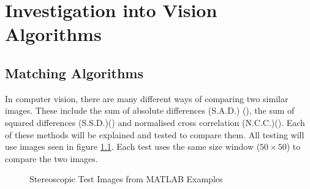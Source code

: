 \chapter{Investigation into Vision Algorithms} \label{Chapter:InvestigationVision}

\section{Matching Algorithms}\label{Section:Comparison}
In computer vision, there are many different ways of comparing two similar images. These include the sum of absolute differences (S.A.D.) (\cite{Hamzah:DistanceDetection}), the sum of squared differences (S.S.D.)(\cite{Mrovlje:Distance_Stereoscopic}) and  normalised cross correlation (N.C.C.)(\cite{zhao2006image}). Each of these methods will be explained and tested to compare them. All testing will use images seen in figure \ref{fig:StereoTest}. Each test uses the same size window ($50\times50$) to compare the two images. 

\begin{figure}
\centering
{}
\caption{Stereoscopic Test Images from MATLAB Examples}
\label{fig:StereoTest}
\end{figure}


